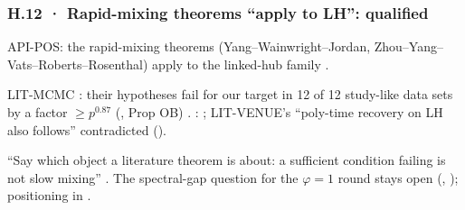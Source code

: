 \subsubsection*{H.12 · Rapid-mixing theorems ``apply to LH'': qualified}
\begin{description}[leftmargin=1.3em,style=unboxed,font=\normalfont]
\item[\textbf{Claim.}] API-POS: the rapid-mixing theorems (Yang--Wainwright--Jordan, Zhou--Yang--Vats--Roberts--Rosenthal) apply to the linked-hub family .
\item[\textbf{Failed.}] LIT-MCMC : their hypotheses fail for our target in 12 of 12 study-like data sets by a factor $\ge p^{0.87}$ (, Prop OB) . :  ; LIT-VENUE's ``poly-time recovery on LH also follows'' contradicted ().
\item[\textbf{Lesson.}] ``Say which object a literature theorem is about: a sufficient condition failing is not slow mixing'' . The spectral-gap question for the $\varphi=1$ round stays open (, ); positioning in .
\end{description}


